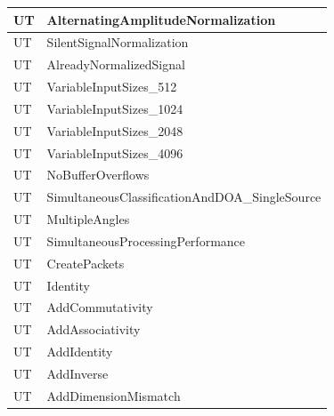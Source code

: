 \documentclass[12pt, titlepage]{article}
\newcounter{unitTest}
\newcommand{\mtheunitTest}{UT\theunitTest}
\begin{document}
{\begin{longtable}{|p{2cm}|p{11cm}|}
    {unitTest} \mtheunitTest
    \label{AlternatingAmplitudeNormalization} &
    AlternatingAmplitudeNormalization \\ \hline
    {unitTest} \mtheunitTest \label{SilentSignalNormalization} &
    SilentSignalNormalization \\ \hline
    {unitTest} \mtheunitTest \label{AlreadyNormalizedSignal} &
    AlreadyNormalizedSignal \\ \hline
    {unitTest} \mtheunitTest \label{VariableInputSizes_512} &
    VariableInputSizes\_512 \\ \hline
    {unitTest} \mtheunitTest \label{VariableInputSizes_1024} &
    VariableInputSizes\_1024 \\ \hline
    {unitTest} \mtheunitTest \label{VariableInputSizes_2048} &
    VariableInputSizes\_2048 \\ \hline
    {unitTest} \mtheunitTest \label{VariableInputSizes_4096} &
    VariableInputSizes\_4096 \\ \hline
    {unitTest} \mtheunitTest \label{NoBufferOverflows} &
    NoBufferOverflows \\ \hline

    {unitTest} \mtheunitTest
    \label{SimultaneousClassificationAndDOA_SingleSource} &
    SimultaneousClassificationAndDOA\_SingleSource \\ \hline
    {unitTest} \mtheunitTest \label{MultipleAngles} &
    MultipleAngles \\ \hline
    {unitTest} \mtheunitTest
    \label{SimultaneousProcessingPerformance} &
    SimultaneousProcessingPerformance \\ \hline

    {unitTest} \mtheunitTest \label{CreatePackets} &
    CreatePackets \\ \hline


    {unitTest} \mtheunitTest \label{Identity} & Identity \\
    \hline

    {unitTest} \mtheunitTest \label{AddCommutativity} &
    AddCommutativity \\ \hline
    {unitTest} \mtheunitTest \label{AddAssociativity} &
    AddAssociativity \\ \hline
    {unitTest} \mtheunitTest \label{AddIdentity} & AddIdentity \\
    \hline
    {unitTest} \mtheunitTest \label{AddInverse} & AddInverse \\
    \hline
    {unitTest} \mtheunitTest \label{AddDimensionMismatch} &
    AddDimensionMismatch \\ \hline


\end{longtable}}
\end{document}
